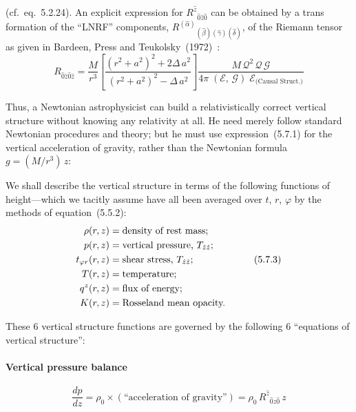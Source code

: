 (cf.\ eq.~5.2.24).  An explicit expression for $R^{\hat{z}}{}_{\hat{0}\hat{z}\hat{0}}$ can be obtained by a trans%
formation of the ``LNRF'' components, $R^{(\hat{\alpha})}{}_{(\hat{\beta})(\hat{\gamma})(\hat{\delta})}$, of the Riemann tensor as
given in Bardeen, Press and Teukolsky~(1972)~\cite{BardeenPressTeukolsky1972}:
%
\begin{equation}
\tag{5.7.2}
R_{\hat{0}\hat{z}\hat{0}\hat{z}}
= \frac{M}{r^3}
  \left[
    \frac{(r^2 + a^2)^2 + 2\Delta\, a^2}{(r^2 + a^2)^2 - \Delta\, a^2}
  \right]
  \frac{M\,\mathscr{Q}^2\,\mathscr{Q}\,\mathscr{G}}
       {4\pi\;(\mathscr{E},\,\mathscr{G})\;\mathscr{E}_{\text{(Causal Struct.)}}}
\end{equation}

Thus, a Newtonian astrophysicist can build a relativistically correct vertical
structure without knowing any relativity at all.  He need merely follow standard
Newtonian procedures and theory; but he must use expression~(5.7.1) for the
vertical acceleration of gravity, rather than the Newtonian formula $g = (M/r^3)\,z$:

We shall describe the vertical structure in terms of the following functions of
height---which we tacitly assume have all been averaged over $t$, $r$, $\varphi$ by the
methods of equation~(5.5.2):
%
\begin{alignat}{2}
\rho(r,z) &= \text{density of rest mass;} & \notag \\
p(r,z)   &= \text{vertical pressure, } T_{\hat{z}\hat{z}}\text{;} & \notag \\
t_{\varphi r}(r,z) &= \text{shear stress, } T_{\hat{z}\hat{z}}\text{;} & \tag{5.7.3} \\
T(r,z)   &= \text{temperature;} & \notag \\
q^z(r,z) &= \text{flux of energy;} & \notag \\
K(r,z)   &= \text{Rosseland mean opacity.} & \notag
\end{alignat}

These 6 vertical structure functions are governed by the following 6 ``equations
of vertical structure'':

\paragraph{Vertical pressure balance}
%
\begin{equation}
\tag{5.7.4a}
\frac{dp}{dz}
= \rho_0 \times (\text{``acceleration of gravity''})
= \rho_0\, R^{\hat{z}}{}_{\hat{0}\hat{z}\hat{0}}\, z
\end{equation}

